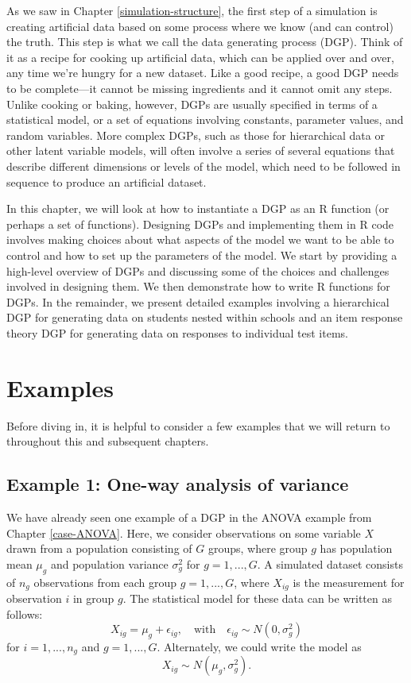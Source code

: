 \documentclass[
]{book}
\begin{document}
As we saw in Chapter \ref{simulation-structure}, the first step of a simulation is creating artificial data based on some process where we know (and can control) the truth.
This step is what we call the data generating process (DGP).
Think of it as a recipe for cooking up artificial data, which can be applied over and over, any time we're hungry for a new dataset.
Like a good recipe, a good DGP needs to be complete---it cannot be missing ingredients and it cannot omit any steps.
Unlike cooking or baking, however, DGPs are usually specified in terms of a statistical model, or a set of equations involving constants, parameter values, and random variables.
More complex DGPs, such as those for hierarchical data or other latent variable models, will often involve a series of several equations that describe different dimensions or levels of the model, which need to be followed in sequence to produce an artificial dataset.

In this chapter, we will look at how to instantiate a DGP as an R function (or perhaps a set of functions).
Designing DGPs and implementing them in R code involves making choices about what aspects of the model we want to be able to control and how to set up the parameters of the model.
We start by providing a high-level overview of DGPs and discussing some of the choices and challenges involved in designing them.
We then demonstrate how to write R functions for DGPs.
In the remainder, we present detailed examples involving a hierarchical DGP for generating data on students nested within schools and an item response theory DGP for generating data on responses to individual test items.

\section{Examples}\label{DGP-examples}

Before diving in, it is helpful to consider a few examples that we will return to throughout this and subsequent chapters.

\subsection{Example 1: One-way analysis of variance}\label{ANOVA-example}

We have already seen one example of a DGP in the ANOVA example from Chapter \ref{case-ANOVA}. Here, we consider observations on some variable \(X\) drawn from a population consisting of \(G\) groups, where group \(g\) has population mean \(\mu_g\) and population variance \(\sigma_g^2\) for \(g = 1,...,G\).
A simulated dataset consists of \(n_g\) observations from each group \(g = 1,...,G\), where \(X_{ig}\) is the measurement for observation \(i\) in group \(g\).
The statistical model for these data can be written as follows:
\[ 
X_{ig} = \mu_g + \epsilon_{ig}, \quad \mbox{with} \quad \epsilon_{ig} \sim N( 0, \sigma^2_g )
\]
for \(i = 1,...,n_g\) and \(g = 1,...,G\).
Alternately, we could write the model as
\[
X_{ig} \sim N( \mu_g, \sigma_g^2 ).
\]
\end{document}
